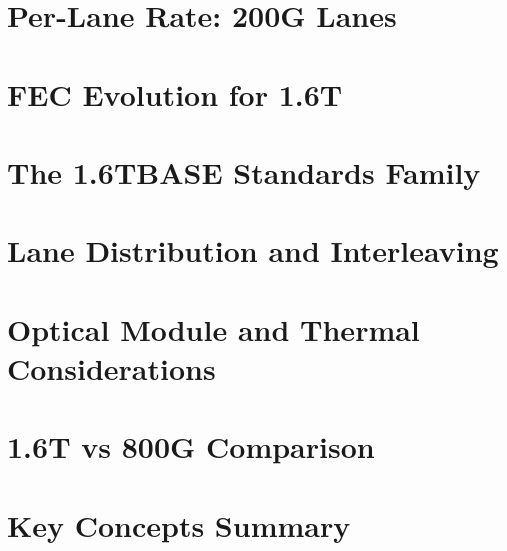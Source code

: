 \documentclass[openany]{tufte-book}
\begin{document}
\section{Per-Lane Rate: 200G Lanes}


\section{FEC Evolution for 1.6T}


\section{The 1.6TBASE Standards Family}


\section{Lane Distribution and Interleaving}


\section{Optical Module and Thermal Considerations}


\section{1.6T vs 800G Comparison}


\section{Key Concepts Summary}

\end{document}
